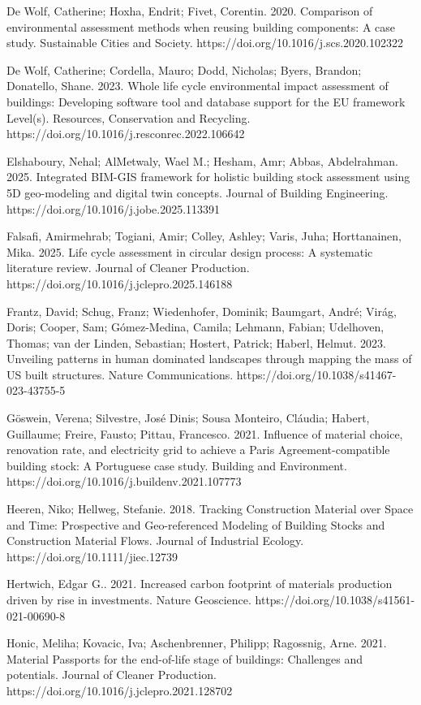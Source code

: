 De Wolf, Catherine; Hoxha, Endrit; Fivet, Corentin. 2020. Comparison of environmental assessment methods when reusing building components: A case study. Sustainable Cities and Society. https://doi.org/10.1016/j.scs.2020.102322

De Wolf, Catherine; Cordella, Mauro; Dodd, Nicholas; Byers, Brandon; Donatello, Shane. 2023. Whole life cycle environmental impact assessment of buildings: Developing software tool and database support for the EU framework Level(s). Resources, Conservation and Recycling. https://doi.org/10.1016/j.resconrec.2022.106642

Elshaboury, Nehal; AlMetwaly, Wael M.; Hesham, Amr; Abbas, Abdelrahman. 2025. Integrated BIM-GIS framework for holistic building stock assessment using 5D geo-modeling and digital twin concepts. Journal of Building Engineering. https://doi.org/10.1016/j.jobe.2025.113391

Falsafi, Amirmehrab; Togiani, Amir; Colley, Ashley; Varis, Juha; Horttanainen, Mika. 2025. Life cycle assessment in circular design process: A systematic literature review. Journal of Cleaner Production. https://doi.org/10.1016/j.jclepro.2025.146188

Frantz, David; Schug, Franz; Wiedenhofer, Dominik; Baumgart, André; Virág, Doris; Cooper, Sam; Gómez-Medina, Camila; Lehmann, Fabian; Udelhoven, Thomas; van der Linden, Sebastian; Hostert, Patrick; Haberl, Helmut. 2023. Unveiling patterns in human dominated landscapes through mapping the mass of US built structures. Nature Communications. https://doi.org/10.1038/s41467-023-43755-5

Göswein, Verena; Silvestre, José Dinis; Sousa Monteiro, Cláudia; Habert, Guillaume; Freire, Fausto; Pittau, Francesco. 2021. Influence of material choice, renovation rate, and electricity grid to achieve a Paris Agreement-compatible building stock: A Portuguese case study. Building and Environment. https://doi.org/10.1016/j.buildenv.2021.107773

Heeren, Niko; Hellweg, Stefanie. 2018. Tracking Construction Material over Space and Time: Prospective and Geo-referenced Modeling of Building Stocks and Construction Material Flows. Journal of Industrial Ecology. https://doi.org/10.1111/jiec.12739

Hertwich, Edgar G.. 2021. Increased carbon footprint of materials production driven by rise in investments. Nature Geoscience. https://doi.org/10.1038/s41561-021-00690-8

Honic, Meliha; Kovacic, Iva; Aschenbrenner, Philipp; Ragossnig, Arne. 2021. Material Passports for the end-of-life stage of buildings: Challenges and potentials. Journal of Cleaner Production. https://doi.org/10.1016/j.jclepro.2021.128702

